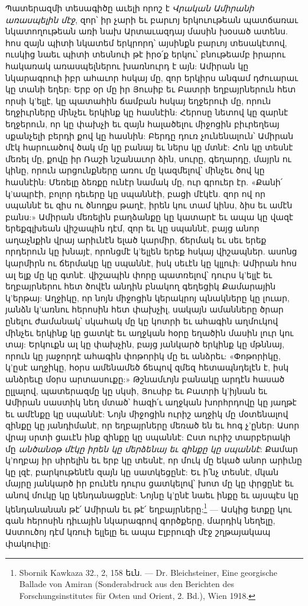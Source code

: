 \documentclass{article}
\begin{document}
{Պատերազմի տեսագիծը աւելի որոշ է \emph{Վրական Ամիրանի առասպելին մէջ}, զոր՝ իր չարի եւ բարւոյ երկուութեան պատճառաւ նկատողութեան առի նախ Արտաւազդայ մասին խօսած ատենս. հոս զայն պիտի նկատեմ երկրորդ՝ այսինքն բարւոյ տեսակէտով, ուսկից նաեւ պիտի տեսնուի թէ իրօ՛ք երկու՝ բնութեամբ իրարու հակառակ առասպելներու խառնուրդ է այն: Ամիրան կը նկարագրուի իբր ահաւոր հսկայ մը, զոր երկիրս անգամ դժուարաւ կը տանի եղեր: Երբ օր մը իր Յուսիբ եւ Բատրի եղբայրներուն հետ որսի կ'ելլէ, կը պատահին ճամբան հսկայ եղջերուի մը, որուն եղջիւրները մինչեւ երկինք կը հասնէին: Հերոսը նետով կը զարնէ եղջերուն, որ կը փախչի եւ զայն հալածելու միջոցին բիւրեղեայ սքանչելի բերդի քով կը հասնին: Բերդը դուռ չունենալուն՝ Ամիրան մէկ հարուածով ծակ մը կը բանայ եւ ներս կը մտնէ: Հոն կը տեսնէ մեռել մը, քովը իր Ռաշի նշանաւոր ձին, սուրը, գեղարդը, մայրն ու կինը, որուն արցունքները առու մը կազմելով՝ մինչեւ ծով կը հասնէին: Մեռելը ձեռքը ունէր նամակ մը, ուր գրուեր էր. «Քանի՛ կ'ապրէի, բոլոր դեւերը կը սպաննէի, բացի մէկէն. զոր ով որ սպաննէ եւ զիս ու ծնողքս թաղէ, իրեն կու տամ կինս, ձիս եւ ամէն բանս:» Ամիրան մեռելին բաղձանքը կը կատարէ եւ ապա կը վազէ երեքգլխեան վիշապին դէմ, զոր եւ կը սպաննէ, բայց անոր աղաչնքին վրայ արիւնէն ելած կարմիր, ճերմակ եւ սեւ երեք որդերուն կը խնայէ, որոնցմէ կ'ելլեն երեք հսկայ վիշապներ. ասոնց կարմիրն ու ճերմակը կը սպաննէ, իսկ սեւէն կը կլլուի: Ամիրան հոս ալ ելք մը կը գտնէ. վիշապին փորը պատռելով՝ դուրս կ'ելլէ եւ եղբայրներու հետ ծովէն անդին բնակող գեղեցիկ Քամարային կ'երթայ: Աղջիկը, որ նոյն միջոցին կերակրոյ պնակները կը լուար, յանձն կ'առնու հերոսին հետ փախչիլ, սակայն ամանները ծրար ընելու ժամանակ՝ սկահակ մը կը կոտրի եւ ահագին աղմուկով մինչեւ երկինք կը ցատկէ եւ աղջկան հօրը եղածին մասին լուր կու տայ: Երկուքն ալ կը փախչին, բայց յանկարծ երկինք կը մթննայ, որուն կը յաջորդէ ահագին փոթորիկ մը եւ անձրեւ: «Փոթորիկը, կ'ըսէ աղջիկը, հօրս ամենամեծ ճեպով զմեզ հետապնդելէն է, իսկ անձրեւը մօրս արտասուքը:» Թշնամւոյն բանակը արդէն հասած ըլլալով, պատերազմը կը սկսի, Յուսիբ եւ Բատրի կ'իյնան եւ Ամիրան սաստիկ նեղ մտած՝ հազի՛ւ աղջկան խորհրդովը կը յաղթէ եւ ամէնքը կը սպաննէ: Նոյն միջոցին ուրիշ աղջիկ մը մօտենալով զինքը կը յանդիմանէ, որ եղբայրները մեռած են եւ հոգ չ'ըներ: Ասոր վրայ սրտի ցաւէն ինք զինքը կը սպաննէ: Ըստ ուրիշ տարբերակի մը \emph{անծանօթ մէկը իրեն կը մերձենայ եւ զինքը կը սպաննէ}: Քամար կ'ողբայ իր սիրելին եւ երբ կը տեսնէ, որ մուկ մը եկած անոր արիւնը կը լզէ, բարկութենէն զայն կը սատկեցընէ: Եւ ի՛նչ տեսնէ, մկան մայրը յանկարծ իր բունէն դուրս ցատկելով՝ խոտ մը կը փրցընէ եւ անով մուկը կը կենդանացընէ: Նոյնը կ'ընէ նաեւ ինքը եւ այսպէս կը կենդանանան թէ՛ Ամիրան եւ թէ՛ եղբայրները:\footnote{Sbornik Kawkaza 32., 2, 158 եւն. — Dr. Bleichsteiner, Eine georgische Ballade von Amiran (Sonderabdruck aus den Berichten des Forschungsinstitutes für Osten und Orient, 2. Bd.), Wien 1918.} — Ասկից ետքը կու գան հերոսին դիւային նկարագրով գործքերը, մարդիկ նեղելը, Աստուծոյ դէմ կռուի ելլելը եւ ապա Էլբրուզի մէջ շղթայակապ փակուիլը:

}
\end{document}
